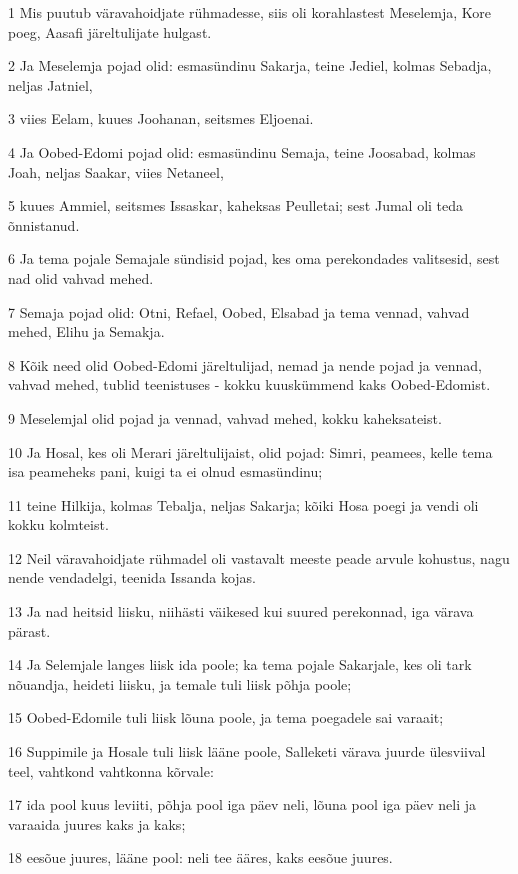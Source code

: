 \par 1 Mis puutub väravahoidjate rühmadesse, siis oli korahlastest Meselemja, Kore poeg, Aasafi järeltulijate hulgast.
\par 2 Ja Meselemja pojad olid: esmasündinu Sakarja, teine Jediel, kolmas Sebadja, neljas Jatniel,
\par 3 viies Eelam, kuues Joohanan, seitsmes Eljoenai.
\par 4 Ja Oobed-Edomi pojad olid: esmasündinu Semaja, teine Joosabad, kolmas Joah, neljas Saakar, viies Netaneel,
\par 5 kuues Ammiel, seitsmes Issaskar, kaheksas Peulletai; sest Jumal oli teda õnnistanud.
\par 6 Ja tema pojale Semajale sündisid pojad, kes oma perekondades valitsesid, sest nad olid vahvad mehed.
\par 7 Semaja pojad olid: Otni, Refael, Oobed, Elsabad ja tema vennad, vahvad mehed, Elihu ja Semakja.
\par 8 Kõik need olid Oobed-Edomi järeltulijad, nemad ja nende pojad ja vennad, vahvad mehed, tublid teenistuses - kokku kuuskümmend kaks Oobed-Edomist.
\par 9 Meselemjal olid pojad ja vennad, vahvad mehed, kokku kaheksateist.
\par 10 Ja Hosal, kes oli Merari järeltulijaist, olid pojad: Simri, peamees, kelle tema isa peameheks pani, kuigi ta ei olnud esmasündinu;
\par 11 teine Hilkija, kolmas Tebalja, neljas Sakarja; kõiki Hosa poegi ja vendi oli kokku kolmteist.
\par 12 Neil väravahoidjate rühmadel oli vastavalt meeste peade arvule kohustus, nagu nende vendadelgi, teenida Issanda kojas.
\par 13 Ja nad heitsid liisku, niihästi väikesed kui suured perekonnad, iga värava pärast.
\par 14 Ja Selemjale langes liisk ida poole; ka tema pojale Sakarjale, kes oli tark nõuandja, heideti liisku, ja temale tuli liisk põhja poole;
\par 15 Oobed-Edomile tuli liisk lõuna poole, ja tema poegadele sai varaait;
\par 16 Suppimile ja Hosale tuli liisk lääne poole, Salleketi värava juurde ülesviival teel, vahtkond vahtkonna kõrvale:
\par 17 ida pool kuus leviiti, põhja pool iga päev neli, lõuna pool iga päev neli ja varaaida juures kaks ja kaks;
\par 18 eesõue juures, lääne pool: neli tee ääres, kaks eesõue juures.
